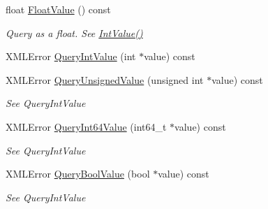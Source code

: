 \begin{DoxyCompactItemize}
\mbox{\label{classtinyxml2_1_1_x_m_l_attribute_a27797b45d21c981257720db94f5f8801}} 
float \hyperlink{classtinyxml2_1_1_x_m_l_attribute_a27797b45d21c981257720db94f5f8801}{Float\+Value} () const
\begin{DoxyCompactList}\small\item\em Query as a float. See \hyperlink{classtinyxml2_1_1_x_m_l_attribute_adfa2433f0fdafd5c3880936de9affa80}{Int\+Value()} \end{DoxyCompactList}\item 
X\+M\+L\+Error \hyperlink{classtinyxml2_1_1_x_m_l_attribute_a6d5176260db00ea301c01af8457cd993}{Query\+Int\+Value} (int $\ast$value) const
\item 
\mbox{\label{classtinyxml2_1_1_x_m_l_attribute_a48a7f3496f1415832e451bd8d09c9cb9}} 
X\+M\+L\+Error \hyperlink{classtinyxml2_1_1_x_m_l_attribute_a48a7f3496f1415832e451bd8d09c9cb9}{Query\+Unsigned\+Value} (unsigned int $\ast$value) const
\begin{DoxyCompactList}\small\item\em See Query\+Int\+Value \end{DoxyCompactList}\item 
\mbox{\label{classtinyxml2_1_1_x_m_l_attribute_a4e25344d6e4159026be34dbddf1dcac2}} 
X\+M\+L\+Error \hyperlink{classtinyxml2_1_1_x_m_l_attribute_a4e25344d6e4159026be34dbddf1dcac2}{Query\+Int64\+Value} (int64\+\_\+t $\ast$value) const
\begin{DoxyCompactList}\small\item\em See Query\+Int\+Value \end{DoxyCompactList}\item 
\mbox{\label{classtinyxml2_1_1_x_m_l_attribute_a5f32e038954256f61c21ff20fd13a09c}} 
X\+M\+L\+Error \hyperlink{classtinyxml2_1_1_x_m_l_attribute_a5f32e038954256f61c21ff20fd13a09c}{Query\+Bool\+Value} (bool $\ast$value) const
\begin{DoxyCompactList}\small\item\em See Query\+Int\+Value \end{DoxyCompactList}\item 
\mbox{\label{classtinyxml2_1_1_x_m_l_attribute_a2aa6e55e8ea03af0609cf6690bff79b9}} 

\end{DoxyCompactItemize}
